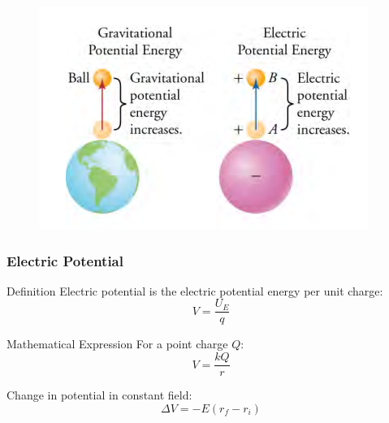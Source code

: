 \documentclass{beamer}
\begin{document}
\begin{frame}
\begin{figure}
    \centering
    \includegraphics[width=0.75\linewidth]{phys11-energy-gravitational-vs-electric-potential.png}
\end{figure}
\end{frame}

\begin{frame}
    \frametitle{Electric Potential}
    \begin{block}{Definition}
        Electric potential is the electric potential energy per unit charge:
        \begin{equation}
            V = \frac{U_E}{q}
        \end{equation}
    \end{block}
    
    \begin{block}{Mathematical Expression}
        For a point charge $Q$:
        \begin{equation}
            V = \frac{kQ}{r}
        \end{equation}
        
        Change in potential in constant field:
        \begin{equation}
            \Delta V = -E(r_f - r_i)
        \end{equation}
    \end{block}
    \end{frame}
\end{document}
